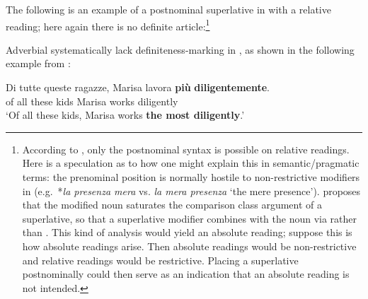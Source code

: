 \documentclass[output=paper
,modfonts
,nonflat]{langsci/langscibook}
\begin{document}
The following is an example of a postnominal superlative in  with a relative reading; here again there is no definite article:\footnote{According to \citet[11--12]{Cinque2010}, only the postnominal syntax is possible on relative readings.  Here is a speculation as to how one might explain this in semantic/pragmatic terms: the prenominal position is normally hostile to non-restrictive modifiers in  (e.g.\ *\textit{la presenza mera} vs. \textit{la mera presenza} `the mere presence'). \citet{Matushansky2008a} proposes that the modified noun saturates the comparison class argument of a superlative, so that a superlative modifier combines with the noun via  rather than . This kind of analysis would yield an absolute reading; suppose this is how absolute readings arise. Then absolute readings would be non-restrictive and relative readings would be restrictive. Placing a superlative postnominally could then serve as an indication that an absolute reading is not intended.}

\ea \label{ex:coppockstrand:60}
\begin{xlist}
\end{xlist}
\z

Adverbial  systematically lack definiteness-marking in , as shown in the following example from \citet[53]{deBoer1986}:

\ea \label{ex:coppockstrand:61}
\gll Di tutte queste ragazze, Marisa lavora \textbf{più} \textbf{diligentemente}.\\ 
of all these kids Marisa works \cmpr{} diligently\\ 
\glt`Of all these kids, Marisa works \textbf{the most diligently}.'
\z
\end{document}
